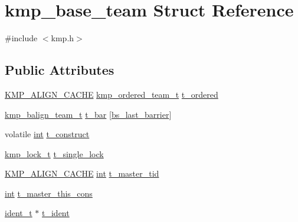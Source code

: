 \hypertarget{structkmp__base__team}{\section{kmp\-\_\-base\-\_\-team Struct Reference}
\label{structkmp__base__team}
}


{\ttfamily \#include $<$kmp.\-h$>$}

\subsection*{Public Attributes}
\begin{DoxyCompactItemize}
\item 
\hyperlink{kmp__os_8h_a6830c178a3906c25cd0138d8365db070}{K\-M\-P\-\_\-\-A\-L\-I\-G\-N\-\_\-\-C\-A\-C\-H\-E} \hyperlink{kmp_8h_a381994e6c7e74730e696ecfaf090fdf7}{kmp\-\_\-ordered\-\_\-team\-\_\-t} \hyperlink{structkmp__base__team_af706f747e4270b26eddd3cc6d55226dc}{t\-\_\-ordered}
\item 
\hyperlink{kmp_8h_abcf28f613e5807641f444590718c5c4b}{kmp\-\_\-balign\-\_\-team\-\_\-t} \hyperlink{structkmp__base__team_aa0629d5b774ba2afbb9bae995f48fb59}{t\-\_\-bar} \mbox{[}\hyperlink{kmp_8h_ad0f7c21f2f1d446087ef5714eb0fd8cfaab77402926ed27b4683d9f72f0c369ed}{bs\-\_\-last\-\_\-barrier}\mbox{]}
\item 
volatile \hyperlink{ittnotify__static_8h_a8b8dcd723308a8cb5d84277c7a3fff70}{int} \hyperlink{structkmp__base__team_ad132b580c5fdcc46130bafb56c527e25}{t\-\_\-construct}
\item 
\hyperlink{kmp__lock_8h_ad1928c8c2d45f7848000a372ec4fde54}{kmp\-\_\-lock\-\_\-t} \hyperlink{structkmp__base__team_abecb95e75ade6626a1ae3126d775cdaf}{t\-\_\-single\-\_\-lock}
\item 
\hyperlink{kmp__os_8h_a6830c178a3906c25cd0138d8365db070}{K\-M\-P\-\_\-\-A\-L\-I\-G\-N\-\_\-\-C\-A\-C\-H\-E} \hyperlink{ittnotify__static_8h_a8b8dcd723308a8cb5d84277c7a3fff70}{int} \hyperlink{structkmp__base__team_afca37baea16bb9bc5f42de830c501277}{t\-\_\-master\-\_\-tid}
\item 
\hyperlink{ittnotify__static_8h_a8b8dcd723308a8cb5d84277c7a3fff70}{int} \hyperlink{structkmp__base__team_a4105b3d4eccd8b895d1c608572def9b2}{t\-\_\-master\-\_\-this\-\_\-cons}
\item 
\hyperlink{group__BASIC__TYPES_ga690fda6b92f039a72db263c6b4394ddb}{ident\-\_\-t} $\ast$ \hyperlink{structkmp__base__team_a77d8cd4f28068144c22cb22d148719c4}{t\-\_\-ident}
\item 

\end{DoxyCompactItemize}
